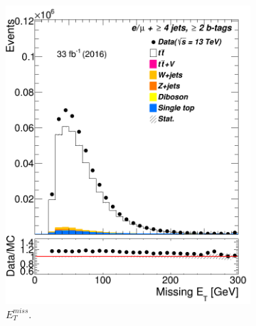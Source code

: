 \begin{figure} [b]
\begin{subfigure}{0.25\textwidth}		\includegraphics[width=\linewidth]{ControlPlots_emujets_2016_4incl_2incl/met_met_emujets_2016.png}
	 	\caption{$E_T^{miss}$.} \label{fig:Sec5}
 \end{subfigure}
 \hspace*{0.5cm}
 	\begin{subfigure}{0.25\textwidth}

\end{subfigure}
\end{figure}
